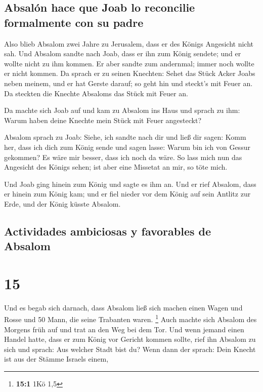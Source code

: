 \hypertarget{absaluxf3n-hace-que-joab-lo-reconcilie-formalmente-con-su-padre}{%
\subsection{Absalón hace que Joab lo reconcilie formalmente con su
padre}\label{absaluxf3n-hace-que-joab-lo-reconcilie-formalmente-con-su-padre}}

 Also blieb Absalom zwei Jahre zu Jerusalem, dass er des
Königs Angesicht nicht sah.  Und Absalom sandte nach
Joab, dass er ihn zum König sendete; und er wollte nicht zu ihm kommen.
Er aber sandte zum andernmal; immer noch wollte er nicht kommen.
 Da sprach er zu seinen Knechten: Sehet das Stück Acker
Joabs neben meinem, und er hat Gerste darauf; so geht hin und steckt's
mit Feuer an. Da steckten die Knechte Absaloms das Stück mit Feuer an.

 Da machte sich Joab auf und kam zu Absalom ins Haus und
sprach zu ihm: Warum haben deine Knechte mein Stück mit Feuer
angesteckt?

 Absalom sprach zu Joab: Siehe, ich sandte nach dir und
ließ dir sagen: Komm her, dass ich dich zum König sende und sagen lasse:
Warum bin ich von Gessur gekommen? Es wäre mir besser, dass ich noch da
wäre. So lass mich nun das Angesicht des Königs sehen; ist aber eine
Missetat an mir, so töte mich.

 Und Joab ging hinein zum König und sagte es ihm an. Und
er rief Absalom, dass er hinein zum König kam; und er fiel nieder vor
dem König auf sein Antlitz zur Erde, und der König küsste Absalom.

\hypertarget{actividades-ambiciosas-y-favorables-de-absalom}{%
\subsection{Actividades ambiciosas y favorables de
Absalom}\label{actividades-ambiciosas-y-favorables-de-absalom}}

\hypertarget{section-14}{%
\section{15}\label{section-14}}

 Und es begab sich darnach, dass Absalom ließ sich machen
einen Wagen und Rosse und 50 Mann, die seine Trabanten waren.
\footnote{\textbf{15:1} 1Kö 1,5}  Auch machte sich Absalom
des Morgens früh auf und trat an den Weg bei dem Tor. Und wenn jemand
einen Handel hatte, dass er zum König vor Gericht kommen sollte, rief
ihn Absalom zu sich und sprach: Aus welcher Stadt bist du? Wenn dann der
sprach: Dein Knecht ist aus der Stämme Israels einem,

